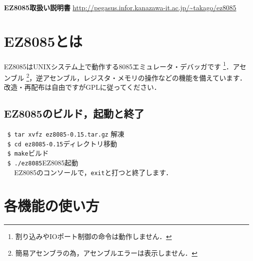 \documentclass{jsarticle}
\begin{document}
\begin{screen}
{\Huge\bf {\sf EZ8085取扱い説明書}}
{\footnotesize \url{http://pegasus.infor.kanazawa-it.ac.jp/~takago/ez8085}}
\end{screen}
\section{EZ8085とは}
EZ8085はUNIXシステム上で動作する8085エミュレータ・デバッガです
\footnote{割り込みやIOポート制御の命令は動作しません．}．アセンブル
\footnote{簡易アセンブラの為，アセンブルエラーは表示しません．}，逆アセンブル，レジスタ・メモリの操作などの機能を備えています．改造・再配布は自由ですがGPLに従ってください．
\subsection{EZ8085のビルド，起動と終了}
\noindent
\verb| $ tar xvfz ez8085-0.15.tar.gz| \return \dotfill 解凍\\
\verb| $ cd ez8085-0.15|\return \dotfill ディレクトリ移動\\
\verb| $ make|\return \dotfill ビルド\\
\verb| $ ./ez8085|\return \dotfill EZ8085起動\\
~~~EZ8085のコンソールで，\verb|exit|\return と打つと終了します．
\section{各機能の使い方}
\end{document}
